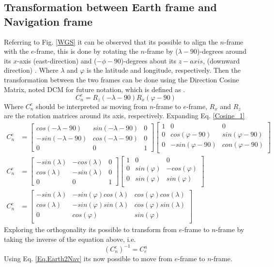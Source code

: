\subsection*{Transformation between Earth frame and Navigation frame}
Referring to Fig. \ref{WGS} it can be observed that its possible to align the $n$-frame with the $e$-frame, this is done by rotating the $n$-frame by ($\lambda-90$)-degrees around its $x$-axis (east-direction) and ($-\phi-90$)-degrees about its $z-axis$, (downward direction) \cite{nonlinear}. Where $\lambda$ and $\varphi$ is the latitude and longitude, respectively. Then the transformation between the two frames can be done using the Direction Cosine Matrix, noted DCM for future notation, which is defined as \cite{nonlinear}.
\begin{equation}
C_n^e=R_z(-\lambda-90)R_x(\varphi-90)
\label{Cosine_1}
\end{equation}
Where $C_n^e$ should be interpreted as moving from $n$-frame to $e$-frame, $R_x$ and $R_z$ are the rotation matrices around its axis, respectively. Expanding Eq. \eqref{Cosine_1} 
\begin{align}
C_n^e &=
\begin{bmatrix}
cos(-\lambda-90) & sin(-\lambda-90) & 0\\
-sin(-\lambda-90) & cos(-\lambda-90) & 0\\
0 & 0 & 1
\end{bmatrix}
\begin{bmatrix}
1 & 0 & 0\\
0 & cos(\varphi-90) & sin(\varphi-90) \\
0 & -sin(\varphi-90) & con(\varphi-90) \\
\end{bmatrix}\\
C_n^e &=
\begin{bmatrix}
-sin(\lambda) & -cos(\lambda) & 0\\
cos(\lambda) & -sin(\lambda) & 0\\
0 & 0 & 1
\end{bmatrix}
\begin{bmatrix}
1 & 0 & 0\\
0 & sin(\varphi) & -cos(\varphi) \\
0 & sin(\varphi) & sin(\varphi) \\
\end{bmatrix}\\
C_n^e &=
\begin{bmatrix}
-sin(\lambda) & -sin(\varphi)cos(\lambda) & cos(\varphi)cos(\lambda) \\
cos(\lambda) & -sin(\varphi)sin(\lambda) &  cos(\varphi)sin(\lambda) \\
0 & cos(\varphi) & sin(\varphi) \\
\end{bmatrix}
\end{align}
Exploring the orthogonality its possible to transform from $e$-frame to $n$-frame by taking the inverse of the equation above, i.e.
\begin{equation}
(C_n^e)^{-1}=C_e^n
\label{Eq.Earth2Nav}
\end{equation}
Using Eq. \eqref{Eq.Earth2Nav} its now possible to move from $e$-frame to $n$-frame. 


